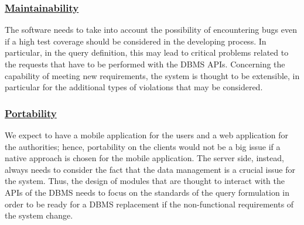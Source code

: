 		\subsubsection[Maintainability]{\hyperlink{toc}{Maintainability}}
			The software needs to take into account the possibility of encountering bugs even if a high test coverage should be considered in the developing process. In particular, in the query definition, this may lead to critical problems related to the requests that have to be performed with the DBMS APIs. Concerning the capability of meeting new requirements, the system is thought to be extensible, in particular for the additional types of violations that may be considered. 
		\subsubsection[Portability]{\hyperlink{toc}{Portability}}
			We expect to have a mobile application for the users and a web application for the authorities; hence, portability on the clients would not be a big issue if a native approach is chosen for the mobile application. The server side, instead, always needs to consider the fact that the data management is a crucial issue for the system. Thus, the design of modules that are thought to interact with the APIs of the DBMS needs to focus on the standards of the query formulation in order to be ready for a DBMS replacement if the non-functional requirements of the system change.
